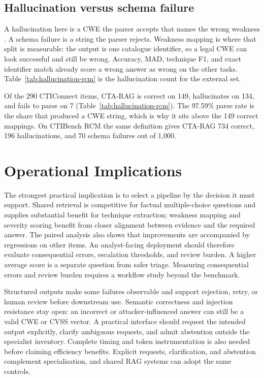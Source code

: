 \documentclass[5p,times,authoryear]{elsarticle}
\begin{document}
\subsection{Hallucination versus schema failure}
\label{sec:hallucination}

A hallucination here is a CWE the parser accepts that names the wrong weakness \citep{maynez2020faithfulness,ji2023survey}. A schema failure is a string the parser rejects. Weakness mapping is where that split is measurable: the output is one catalogue identifier, so a legal CWE can look successful and still be wrong. Accuracy, MAD, technique F1, and exact identifier match already score a wrong answer as wrong on the other tasks. Table~\ref{tab:hallucination-rcm} is the hallucination count for the external set.

Of the 290 CTIConnect items, CTA-RAG is correct on 149, hallucinates on 134, and fails to parse on 7 (Table~\ref{tab:hallucination-rcm}). The 97.59\% parse rate is the share that produced a CWE string, which is why it sits above the 149 correct mappings. On CTIBench RCM the same definition gives CTA-RAG 734 correct, 196 hallucinations, and 70 schema failures out of 1,000.

\section{Operational Implications}\label{sec:impact}

The strongest practical implication is to select a pipeline by the decision
it must support. Shared retrieval is competitive for factual multiple-choice
questions and supplies substantial benefit for technique extraction; weakness
mapping and severity scoring benefit from closer alignment between evidence
and the required answer. The paired analysis also shows that improvements
are accompanied by regressions on other items. An analyst-facing deployment
should therefore evaluate consequential errors, escalation thresholds, and
review burden. A higher average score is a separate question from safer triage.
Measuring consequential errors and review burden requires a workflow study beyond the benchmark.

Structured outputs make some failures observable and support rejection,
retry, or human review before downstream use. Semantic correctness and injection resistance stay open: an incorrect or attacker-influenced
answer can still be a valid CWE or CVSS vector. A practical interface should
request the intended output explicitly, clarify ambiguous requests, and admit
abstention outside the specialist inventory. Complete timing and token
instrumentation is also needed before claiming efficiency benefits. Explicit
requests, clarification, and abstention complement specialisation, and shared
RAG systems can adopt the same controls.
\end{document}
